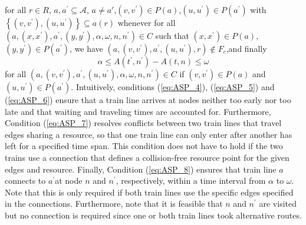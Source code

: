 \documentclass{article}
\begin{document}
for all $r\in R$, ${a, a^\prime} \subseteq \mathcal{A}$, $a\not=a'$,$(v, v^\prime)\in P(a)$,$(u, u^\prime)\in P(a^\prime)$ with $\left\{(v, v^\prime),(u, u^\prime)\right\} \subseteq a(r)$ whenever for all $(a,(x, x^\prime), a^\prime,(y, y^\prime), \alpha, \omega, n, n^\prime)\in C$ such that $(x, x^\prime)\in P(a)$,$(y, y^\prime)\in P(a^\prime)$, we have $(a,(v, v^\prime), a^\prime,(u, u^\prime), r)\not\in F_c$,and finally
\begin{equation}
\alpha\leq A(t^\prime, n^\prime)-A(t, n)\leq \omega\label{eq:ASP_8}
\end{equation}
for all $(a,(v, v^\prime), a^\prime,(u, u^\prime), \alpha, \omega, n, n^\prime)\in C$ if $(v, v^\prime)\in P(a)$ and $(u, u^\prime)\in P(a^\prime)$.
%
Intuitively, conditions (\ref{eq:ASP_4}), (\ref{eq:ASP_5}) and (\ref{eq:ASP_6}) ensure that a train line arrives at nodes neither too early nor too late and that waiting and traveling times are accounted for. Furthermore, Condition (\ref{eq:ASP_7}) resolves conflicts between two train lines that travel edges sharing a resource, so that one train line can only enter after another has left for a specified time span. This condition does not have to hold if the two trains use a connection that defines a collision-free resource point for the given edges and resource. Finally, Condition (\ref{eq:ASP_8}) ensures that train line $a$ connects to $a^\prime$at node $n$ and $n^\prime$, respectively, within a time interval from $\alpha$ to $\omega$. Note that this is only required if both train lines use the specific edges specified in the connections. Furthermore, note that it is feasible that $n$ and $n^\prime$ are visited but no connection is required since one or both train lines took alternative routes.
\end{document}
